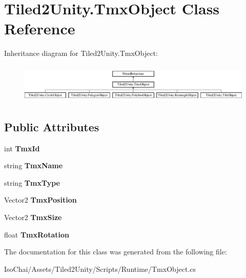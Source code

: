 \hypertarget{class_tiled2_unity_1_1_tmx_object}{}\section{Tiled2\+Unity.\+Tmx\+Object Class Reference}
\label{class_tiled2_unity_1_1_tmx_object}
Inheritance diagram for Tiled2\+Unity.\+Tmx\+Object\+:\begin{figure}[H]
\begin{center}
\leavevmode
\includegraphics[height=1.877095cm]{class_tiled2_unity_1_1_tmx_object}
\end{center}
\end{figure}
\subsection*{Public Attributes}
\begin{DoxyCompactItemize}
\item 
\mbox{\label{class_tiled2_unity_1_1_tmx_object_af523fddb695142cbb86c0eaca115e883}} 
int {\bfseries Tmx\+Id}
\item 
\mbox{\label{class_tiled2_unity_1_1_tmx_object_a865abf541cffb969b3650374a07acb64}} 
string {\bfseries Tmx\+Name}
\item 
\mbox{\label{class_tiled2_unity_1_1_tmx_object_a1ebc9e3f4e1678dcf293df85e8412c1d}} 
string {\bfseries Tmx\+Type}
\item 
\mbox{\label{class_tiled2_unity_1_1_tmx_object_a5d89cb3b0c2258059062fed163c49942}} 
Vector2 {\bfseries Tmx\+Position}
\item 
\mbox{\label{class_tiled2_unity_1_1_tmx_object_aa5516a13f4916bb09dbc25014505d03f}} 
Vector2 {\bfseries Tmx\+Size}
\item 
\mbox{\label{class_tiled2_unity_1_1_tmx_object_a580117e9008c354b82ffb7d8656af51d}} 
float {\bfseries Tmx\+Rotation}
\end{DoxyCompactItemize}


The documentation for this class was generated from the following file\+:\begin{DoxyCompactItemize}
\item 
Iso\+Chai/\+Assets/\+Tiled2\+Unity/\+Scripts/\+Runtime/Tmx\+Object.\+cs\end{DoxyCompactItemize}
